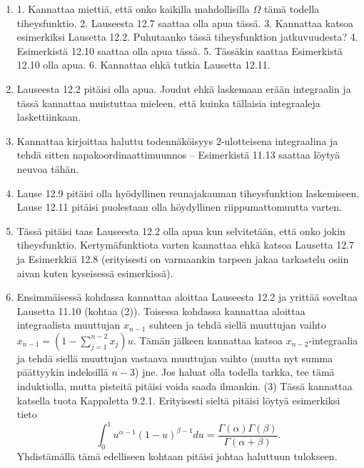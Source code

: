 \documentclass[11pt,a4paper]{amsart}
\newcommand{\1}{\mathbf{1}}
\begin{document}
\begin{Solution}
\begin{enumerate}
\item 1. Kannattaa miettiä, että onko kaikilla mahdollisilla $\Omega$ tämä todella tiheysfunktio. 2. Lauseesta 12.7 saattaa olla apua tässä. 3. Kannattaa katsoa esimerkiksi Lausetta 12.2. Puhutaanko tässä tiheysfunktion jatkuvuudesta? 4. Esimerkistä 12.10 saattaa olla apua tässä. 5. Tässäkin saattaa Esimerkistä 12.10 olla apua.  6. Kannattaa ehkä tutkia Lausetta 12.11.
\item Lauseesta 12.2 pitäisi olla apua. Joudut ehkä laskemaan erään integraalin ja tässä kannattaa muistuttaa mieleen, että kuinka tällaisia integraaleja laskettiinkaan.
\item Kannattaa kirjoittaa haluttu todennäköisyys 2-ulotteisena integraalina ja tehdä sitten napakoordinaattimuunnos -- Esimerkistä 11.13 saattaa löytyä neuvoa tähän.
\item Lause 12.9 pitäisi olla hyödyllinen reunajakauman tiheysfunktion laskemiseen. Lause 12.11 pitäisi puolestaan olla höydyllinen riippumattomuutta varten.
\item Tässä pitäisi taas Lauseesta 12.2 olla apua kun selvitetään, että onko jokin tiheysfunktio. Kertymäfunktiota varten kannattaa ehkä katsoa Lausetta 12.7 ja Esimerkkiä 12.8 (erityisesti on varmaankin tarpeen jakaa tarkastelu osiin aivan kuten kyseisessä esimerkissä).
\item Ensimmäisessä kohdassa kannattaa aloittaa Lauseesta 12.2 ja yrittää soveltaa Lausetta 11.10 (kohtaa (2)). Toisessa kohdassa kannattaa aloittaa integraalista muuttujan $x_{n-1}$ suhteen ja tehdä siellä muuttujan vaihto $x_{n-1}=(1-\sum_{j=1}^{n-2}x_j)u$. Tämän jälkeen kannattaa katsoa $x_{n-2}$-integraalia ja tehdä siellä muuttujan vastaava muuttujan vaihto (mutta nyt summa päättyykin indeksillä $n-3$) jne. Jos haluat olla todella tarkka, tee tämä induktiolla, mutta pisteitä pitäisi voida saada ilmankin. (3) Tässä kannattaa katsella tuota Kappaletta 9.2.1. Erityisesti sieltä pitäisi löytyä esimerkiksi tieto 
\[
\int_0^1 u^{\alpha-1}(1-u)^{\beta-1}du=\frac{\Gamma(\alpha)\Gamma(\beta)}{\Gamma(\alpha+\beta)}.
\]
Yhdistämällä tämä edelliseen kohtaan pitäisi johtaa haluttuun tulokseen.
\end{enumerate}
\end{Solution}
\end{document}
